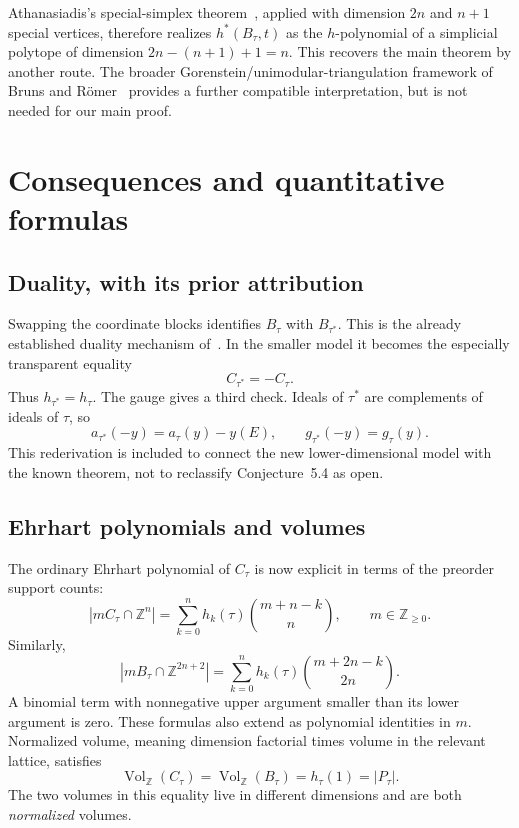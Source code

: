\documentclass[11pt]{article}
\numberwithin{equation}{section}
\theoremstyle{definition}
\newcommand{\Z}{\mathbb Z}
\newcommand{\N}{\mathbb Z_{\geq0}}
\newcommand{\Pt}{P_\tau}
\newcommand{\Vol}{\operatorname{Vol}_{\Z}}
\begin{document}
Athanasiadis's special-simplex theorem~\cite[Theorem~3.5]{AthSpecial}, applied
with dimension $2n$ and $n+1$ special vertices, therefore realizes
$h^*(B_\tau,t)$ as the $h$-polynomial of a simplicial polytope of dimension
$2n-(n+1)+1=n$. This recovers the main theorem by another route. The broader
Gorenstein/unimodular-triangulation framework of Bruns and R\"omer~\cite{BR}
provides a further compatible interpretation, but is not needed for our main
proof.

\section{Consequences and quantitative formulas}\label{sec:consequences}

\subsection{Duality, with its prior attribution}

Swapping the coordinate blocks identifies $B_\tau$ with $B_{\tau^*}$.
This is the already established duality mechanism of~\cite{DHLTW}. In the
smaller model it becomes the especially transparent equality
\begin{equation}
 C_{\tau^*}=-C_\tau.\label{eq:dualC}
\end{equation}
Thus $h_{\tau^*}=h_\tau$. The gauge gives a third check. Ideals of $\tau^*$
are complements of ideals of $\tau$, so
\[
 a_{\tau^*}(-y)=a_\tau(y)-y(E),\qquad
 g_{\tau^*}(-y)=g_\tau(y).
\]
This rederivation is included to connect the new lower-dimensional model with
the known theorem, not to reclassify Conjecture~5.4 as open.

\subsection{Ehrhart polynomials and volumes}

The ordinary Ehrhart polynomial of $C_\tau$ is now explicit in terms of the
preorder support counts:
\begin{equation}
 |mC_\tau\cap\Z^n|=\sum_{k=0}^{n}h_k(\tau)\binom{m+n-k}{n},
 \qquad m\in\N.\label{eq:ehrC}
\end{equation}
Similarly,
\begin{equation}
 |mB_\tau\cap\Z^{2n+2}|=
 \sum_{k=0}^{n}h_k(\tau)\binom{m+2n-k}{2n}.\label{eq:ehrB}
\end{equation}
A binomial term with nonnegative upper argument smaller than its lower
argument is zero. These formulas also extend as polynomial identities in $m$.
Normalized volume, meaning dimension factorial times volume in the relevant
lattice, satisfies
\begin{equation}
 \Vol(C_\tau)=\Vol(B_\tau)=h_\tau(1)=|\Pt|.\label{eq:vol}
\end{equation}
The two volumes in this equality live in different dimensions and are both
\emph{normalized} volumes.
\end{document}
